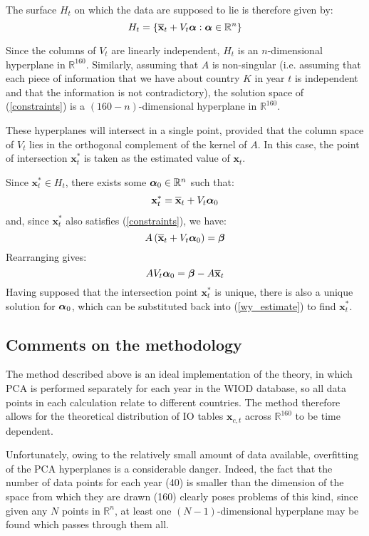 \documentclass[preprint,authoryear,3p]{elsarticle}
\begin{document}
The surface $H_t$ on which the data are supposed to lie is therefore given by:
$$
H_{t} = \left\{ \overline{\textbf{x}}_t + V_t \mbox{\boldmath$\alpha$} : \mbox{\boldmath$\alpha$} \in \mathbb{R}^n \right\}
$$

Since the columns of $V_t$ are linearly independent, $H_t$ is an $n$-dimensional hyperplane in $\mathbb{R}^{160}$. Similarly, assuming that $A$ is non-singular (i.e. assuming that each piece of information that we have about country $K$ in year $t$ is independent and that the information is not contradictory), the solution space of (\ref{constraints}) is a $(160-n)$-dimensional hyperplane in $\mathbb{R}^{160}$.

These hyperplanes will intersect in a single point, provided that the column space of $V_t$ lies in the orthogonal complement of the kernel of $A$. In this case, the point of intersection $\textbf{x}^*_t$ is taken as the estimated value of $\textbf{x}_t$.

Since $\textbf{x}^*_t \in H_{t}$, there exists some $\mbox{\boldmath$\alpha$}_0 \in \mathbb{R}^n$ such that:
\begin{align} \label{wy_estimate}
\textbf{x}^*_t = \overline{\textbf{x}}_t + V_t \mbox{\boldmath$\alpha$}_0
\end{align}
and, since $\textbf{x}^*_t$ also satisfies (\ref{constraints}), we have:
$$
A \left( \overline{\textbf{x}}_t + V_t \mbox{\boldmath$\alpha$}_0 \right) = \mbox{\boldmath$\beta$}
$$
Rearranging gives:
$$
A V_t \mbox{\boldmath$\alpha$}_0 = \mbox{\boldmath$\beta$} - A \overline{\textbf{x}}_t
$$
Having supposed that the intersection point $\textbf{x}^*_t$ is unique, there is also a unique solution for $\mbox{\boldmath$\alpha$}_0$, which can be substituted back into (\ref{wy_estimate}) to find $\textbf{x}^*_t$.





\subsection{Comments on the methodology}

The method described above is an ideal implementation of the theory, in which PCA is performed separately for each year in the WIOD database, so all data points in each calculation relate to different countries. The method therefore allows for the theoretical distribution of IO tables $\textbf{x}_{c,t}$ across $\mathbb{R}^{160}$ to be time dependent.

Unfortunately, owing to the relatively small amount of data available, overfitting of the PCA hyperplanes is a considerable danger. Indeed, the fact that the number of data points for each year (40) is smaller than the dimension of the space from which they are drawn (160) clearly poses problems of this kind, since given any $N$ points in $\mathbb{R}^n$, at least one $(N-1)$-dimensional hyperplane may be found which passes through them all.
\end{document}
